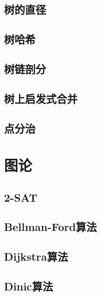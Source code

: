 \documentclass[twocolumn,a4]{article}  %
\begin{document}
		\subsection{树的直径}
	 	 	
	 	 	
		\subsection{树哈希}
	 	 	
	 	 	
		\subsection{树链剖分}
	 	 	
	 	 	
		\subsection{树上启发式合并}
	 	 	
	 	 	
		\subsection{点分治}
			
	 	 	
	\section{图论}
		\subsection{2-SAT}
	 	 	

		\subsection{Bellman-Ford算法}
	 	 	
	 	 	
		\subsection{Dijkstra算法}
	 	 	
	 	 	
		\subsection{Dinic算法}
	 	 	
	 	 	
\end{document}
